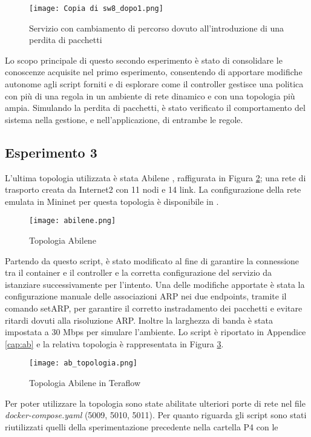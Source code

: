 \begin{figure}[h]
    \centering
   \texttt{[image: Copia di sw8\_dopo1.png]}
    \caption{Servizio con cambiamento di percorso dovuto all'introduzione di una perdita di pacchetti}
    \label{fig:sw8 dopo}
\end{figure}
Lo scopo principale di questo secondo esperimento è stato di consolidare le conoscenze acquisite nel primo esperimento,
consentendo di apportare modifiche autonome agli script forniti e di esplorare come il controller gestisce una politica con più di una regola
in un ambiente di rete dinamico e con una topologia più ampia. 
Simulando la perdita di pacchetti, è stato verificato il comportamento del sistema nella gestione,
e nell'applicazione, di entrambe le regole.
\subsection{Esperimento 3}
L'ultima topologia utilizzata è stata Abilene \cite{abilene}, raffigurata in Figura \ref{fig:ab}; una rete di trasporto creata da Internet2 con 11 nodi e 14 link.
La configurazione della rete emulata in Mininet per questa topologia è disponibile in \cite{topab}. 
\begin{figure}[h]
    \centering
   \texttt{[image: abilene.png]}
    \caption{Topologia Abilene}
    \label{fig:ab}
\end{figure}
Partendo da questo script, è stato modificato al fine di garantire la connessione tra il container e il controller e 
la corretta configurazione del servizio da istanziare successivamente per l'intento.
Una delle modifiche apportate è stata la configurazione manuale delle associazioni ARP nei due endpoints, tramite il comando setARP,
per garantire il corretto instradamento dei pacchetti e evitare ritardi dovuti alla risoluzione ARP.
Inoltre la larghezza di banda è stata impostata a 30 Mbps per simulare l'ambiente.
Lo script è riportato in Appendice \ref{cap:ab} e la relativa topologia è rappresentata in Figura \ref{fig:d}. 
\begin{figure}[h]
    \centering
   \texttt{[image: ab\_topologia.png]}
    \caption{Topologia Abilene in Teraflow}
    \label{fig:d}
\end{figure}
Per poter utilizzare la topologia sono state abilitate ulteriori porte di rete nel file \textit{docker-compose.yaml} (5009, 5010, 5011).
\newline Per quanto riguarda gli script sono stati riutilizzati quelli della sperimentazione precedente nella cartella P4 \cite{ofc} con le 
